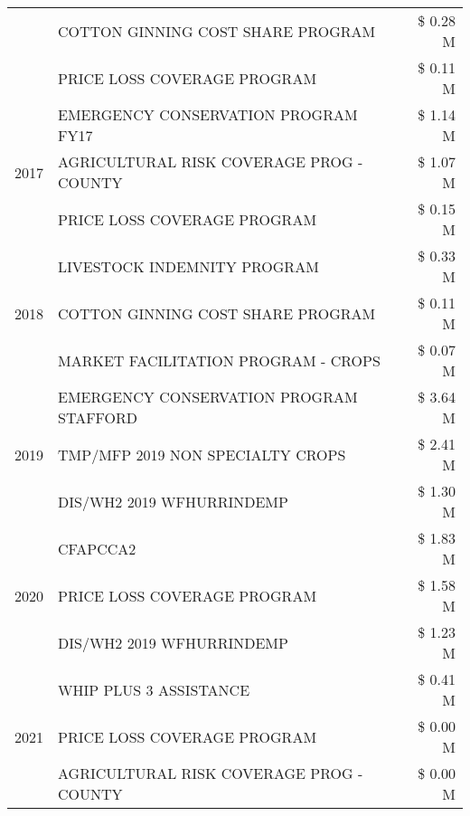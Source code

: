 \begin{tabular}{llr}
 & COTTON GINNING COST SHARE PROGRAM & \$ 0.28 M \\
 & PRICE LOSS COVERAGE PROGRAM & \$ 0.11 M \\
\cline{1-3}
\multirow[t]{3}{*}{2017} & EMERGENCY CONSERVATION PROGRAM FY17 & \$ 1.14 M \\
 & AGRICULTURAL RISK COVERAGE PROG - COUNTY & \$ 1.07 M \\
 & PRICE LOSS COVERAGE PROGRAM & \$ 0.15 M \\
\cline{1-3}
\multirow[t]{3}{*}{2018} & LIVESTOCK INDEMNITY PROGRAM & \$ 0.33 M \\
 & COTTON GINNING COST SHARE PROGRAM & \$ 0.11 M \\
 & MARKET FACILITATION PROGRAM - CROPS & \$ 0.07 M \\
\cline{1-3}
\multirow[t]{3}{*}{2019} & EMERGENCY CONSERVATION PROGRAM STAFFORD & \$ 3.64 M \\
 & TMP/MFP 2019 NON SPECIALTY CROPS & \$ 2.41 M \\
 & DIS/WH2 2019 WFHURRINDEMP & \$ 1.30 M \\
\cline{1-3}
\multirow[t]{3}{*}{2020} & CFAPCCA2 & \$ 1.83 M \\
 & PRICE LOSS COVERAGE PROGRAM & \$ 1.58 M \\
 & DIS/WH2 2019 WFHURRINDEMP & \$ 1.23 M \\
\cline{1-3}
\multirow[t]{3}{*}{2021} & WHIP PLUS 3 ASSISTANCE & \$ 0.41 M \\
 & PRICE LOSS COVERAGE PROGRAM & \$ 0.00 M \\
 & AGRICULTURAL RISK COVERAGE PROG - COUNTY & \$ 0.00 M \\
\cline{1-3}
\bottomrule
\end{tabular}
